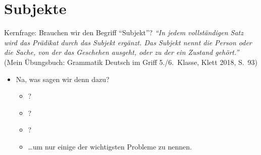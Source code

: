 

\section{Subjekte}

\begin{frame}
  {Kernfrage: Brauchen wir den Begriff "`Subjekt"'?}
  \pause
  \textit{"`In jedem vollständigen Satz wird das Prädikat durch das Subjekt ergänzt. Das Subjekt nennt die Person oder die Sache, von der das Geschehen ausgeht, oder zu der ein Zustand gehört."'}\\
  \pause\Viertelzeile
  {\small (Mein Übungsbuch: Grammatik Deutsch im Griff 5.\slash 6.~Klasse, Klett 2018, S.~93)}
  \pause
  \Halbzeile
  \begin{itemize}[<+->]
    \item Na, was sagen wir denn dazu?
      \begin{itemize}[<+->]
        \item {}?
        \item {}?
        \item {}?
        \item \ldots um nur einige der wichtigsten Probleme zu nennen.
      \end{itemize}
  \end{itemize}
\end{frame}

